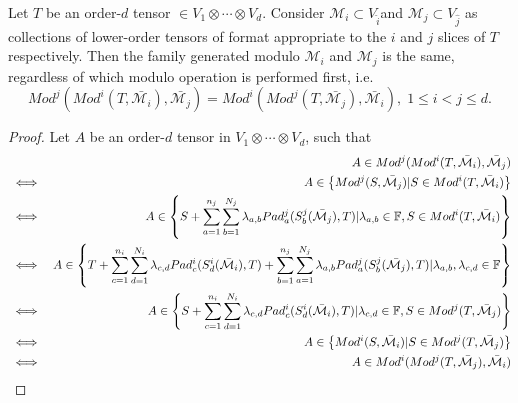 \documentclass[../Lael_John_MasterThesis_Draft.tex]{subfiles}
\begin{document}
\begin{proposition}\label{proposition:commutativemodulo} Let $T$ be an order-$d$ tensor $\in V_1 \otimes \cdots \otimes V_d$. Consider $\mathcal{M}_i \subset V_{\hat{i}}$and $\mathcal{M}_j \subset V_{\hat{j}}$ as collections of lower-order tensors of format appropriate to the $i$ and $j$ slices of $T$ respectively. Then the family generated modulo $\mathcal{M}_i$ and $\mathcal{M}_j$ is the same, regardless of which modulo operation is performed first, i.e.
    \begin{equation}\label{eqn:commutativemodulo}
        Mod^j(Mod^i(T, \bar{\mathcal{M}_i}), \bar{\mathcal{M}_j}) = Mod^i(Mod^j(T, \bar{\mathcal{M}_j}), \bar{\mathcal{M}_i}), \; 1 \leq i < j \leq d.
    \end{equation}
\end{proposition}
\begin{proof}
    Let $A$ be an order-$d$ tensor in $V_1 \otimes \cdots \otimes V_d$, such that
   \begin{eqnarray*}
        &&A \in Mod^j(Mod^i(T, \bar{\mathcal{M}_i}), \bar{\mathcal{M}_j}) \\
        &\iff& A \in \left\{ Mod^j(S, \bar{\mathcal{M}_j}) | S \in Mod^i(T,\bar{\mathcal{M}_i}) \right\}\\
        &\iff& A \in \left\{S + \sum_{a=1}^{n_j}\sum_{b=1}^{N_j}\lambda_{a,b} Pad^j_a(S^j_b(\bar{\mathcal{M}_j}),T) | \lambda_{a,b} \in \mathbb{F}, S \in Mod^i(T,\bar{\mathcal{M}_i}) \right\}\\
        &\iff& A \in \left\{T + \sum_{c=1}^{n_i}\sum_{d=1}^{N_i}\lambda_{c,d} Pad^i_c(S^i_d(\bar{\mathcal{M}_i}),T) + \sum_{b=1}^{n_j}\sum_{a=1}^{N_j}\lambda_{a,b} Pad^j_a(S^j_b(\bar{\mathcal{M}_j}),T) | \lambda_{a,b}, \lambda_{c,d}\in \mathbb{F} \right\}\\
        &\iff& A \in \left\{S + \sum_{c=1}^{n_i}\sum_{d=1}^{N_i}\lambda_{c,d} Pad^i_c(S^i_d(\bar{\mathcal{M}_i}),T) | \lambda_{c,d} \in \mathbb{F}, S \in Mod^j(T,\bar{\mathcal{M}_j}) \right\}\\
        &\iff& A \in \left\{ Mod^i(S, \bar{\mathcal{M}_i}) | S \in Mod^j(T,\bar{\mathcal{M}_j}) \right\}\\
        &\iff& A \in Mod^i(Mod^j(T, \bar{\mathcal{M}_j}), \bar{\mathcal{M}_i})
   \end{eqnarray*} 
\end{proof}
\end{document}
